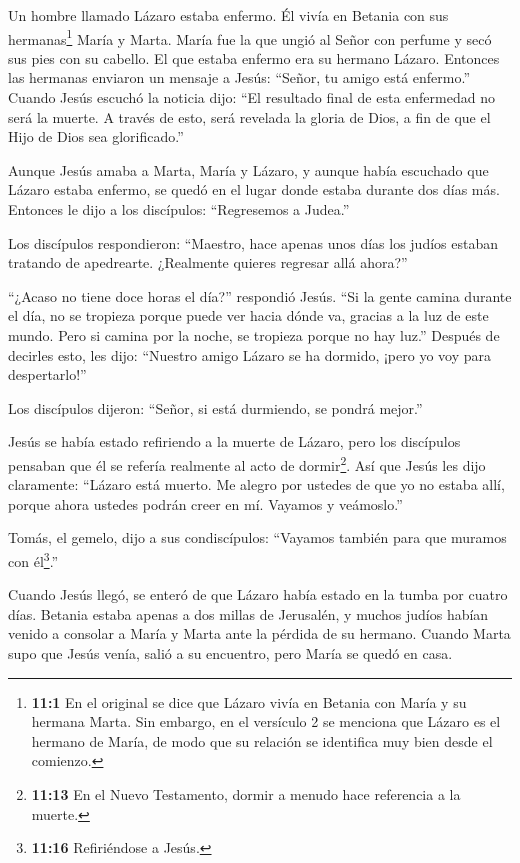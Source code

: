  Un hombre llamado Lázaro estaba enfermo. Él vivía en
Betania con sus hermanas\footnote{\textbf{11:1} En el original se dice
  que Lázaro vivía en Betania con María y su hermana Marta. Sin embargo,
  en el versículo 2 se menciona que Lázaro es el hermano de María, de
  modo que su relación se identifica muy bien desde el comienzo.} María
y Marta.  María fue la que ungió al Señor con perfume y secó
sus pies con su cabello. El que estaba enfermo era su hermano Lázaro.
 Entonces las hermanas enviaron un mensaje a Jesús: ``Señor,
tu amigo está enfermo.''  Cuando Jesús escuchó la noticia
dijo: ``El resultado final de esta enfermedad no será la muerte. A
través de esto, será revelada la gloria de Dios, a fin de que el Hijo de
Dios sea glorificado.''

 Aunque Jesús amaba a Marta, María y Lázaro,  y
aunque había escuchado que Lázaro estaba enfermo, se quedó en el lugar
donde estaba durante dos días más.  Entonces le dijo a los
discípulos: ``Regresemos a Judea.''

 Los discípulos respondieron: ``Maestro, hace apenas unos
días los judíos estaban tratando de apedrearte. ¿Realmente quieres
regresar allá ahora?''

 ``¿Acaso no tiene doce horas el día?'' respondió Jesús.
 ``Si la gente camina durante el día, no se tropieza porque
puede ver hacia dónde va, gracias a la luz de este mundo. Pero si camina
por la noche, se tropieza porque no hay luz.''  Después de
decirles esto, les dijo: ``Nuestro amigo Lázaro se ha dormido, ¡pero yo
voy para despertarlo!''

 Los discípulos dijeron: ``Señor, si está durmiendo, se
pondrá mejor.''

 Jesús se había estado refiriendo a la muerte de Lázaro,
pero los discípulos pensaban que él se refería realmente al acto de
dormir\footnote{\textbf{11:13} En el Nuevo Testamento, dormir a menudo
  hace referencia a la muerte.}.  Así que Jesús les dijo
claramente: ``Lázaro está muerto.  Me alegro por ustedes de
que yo no estaba allí, porque ahora ustedes podrán creer en mí. Vayamos
y veámoslo.''

 Tomás, el gemelo, dijo a sus condiscípulos: ``Vayamos
también para que muramos con él\footnote{\textbf{11:16} Refiriéndose a
  Jesús.}.''

 Cuando Jesús llegó, se enteró de que Lázaro había estado
en la tumba por cuatro días.  Betania estaba apenas a dos
millas de Jerusalén,  y muchos judíos habían venido a
consolar a María y Marta ante la pérdida de su hermano. 
Cuando Marta supo que Jesús venía, salió a su encuentro, pero María se
quedó en casa.

